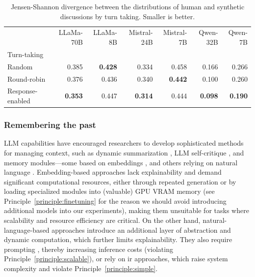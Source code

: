 \begin{table}[ht]
	\caption{Jensen-Shannon divergence between the \diversity distributions  of human and synthetic discussions by turn taking. Smaller is better.}
	\label{tab:divergence-turn_taking}
	\begin{tabular}{lrrrrrr}
		\toprule
		& LLaMa-70B & LLaMa-8B & Mistral-24B & Mistral-7B & Qwen-32B & Qwen-7B \\
		Turn-taking &  &  &  &  &  &  \\
		\midrule
		Random & 0.385 & \textbf{0.428} & 0.334 & 0.458 & 0.166 & 0.266 \\
		Round-robin & 0.376 & 0.436 & 0.340 & \textbf{0.442} & 0.100 & 0.260 \\
		Response-enabled & \textbf{0.353} & 0.447 & \textbf{0.314} & 0.444 & \textbf{0.098} & \textbf{0.190} \\
		\bottomrule
	\end{tabular}
\end{table}


\subsubsection{Remembering the past} %
\label{sec:methodology:management:context}

LLM capabilities have encouraged researchers to develop sophisticated methods for managing context, such as dynamic summarization \cite{balog_2024,park_simulacra}, LLM self-critique \cite{yu_2024_fincon}, and memory modules—some based on embeddings \cite{Vezhnevets2023GenerativeAM}, and others relying on natural language \cite{mou-etal-2024-unveiling, li-etal-2024-econagent, chuang-etal-2024-simulating}. Embedding-based approaches lack explainability and demand significant computational resources, either through repeated generation \cite{balog_2024,adornetto2025_gabms} or by loading specialized modules into (valuable) GPU VRAM memory \cite{Vezhnevets2023GenerativeAM} (see Principle~\ref{principle:finetuning} for the reason we should avoid introducing additional models into our experiments), making them unsuitable for tasks where scalability and resource efficiency are critical. On the other hand, natural-language-based approaches introduce an additional layer of abstraction and dynamic computation, which further limits explainability. They also require prompting \cite{li-etal-2024-econagent, chuang-etal-2024-simulating}, thereby increasing inference costs (violating Principle~\ref{principle:scalable}), or rely on \ac{ir} approaches, which raise system complexity and violate Principle~\ref{principle:simple}.

